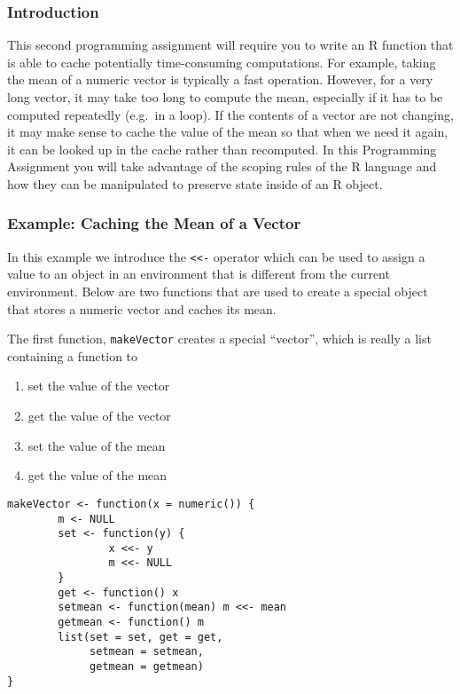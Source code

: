 \documentclass[]{article}
\title{}
\author{}
\date{}
\begin{document}
\maketitle


\subsubsection{Introduction}\label{introduction}

This second programming assignment will require you to write an R
function that is able to cache potentially time-consuming computations.
For example, taking the mean of a numeric vector is typically a fast
operation. However, for a very long vector, it may take too long to
compute the mean, especially if it has to be computed repeatedly
(e.g.~in a loop). If the contents of a vector are not changing, it may
make sense to cache the value of the mean so that when we need it again,
it can be looked up in the cache rather than recomputed. In this
Programming Assignment you will take advantage of the scoping rules of
the R language and how they can be manipulated to preserve state inside
of an R object.

\subsubsection{Example: Caching the Mean of a
Vector}\label{example-caching-the-mean-of-a-vector}

In this example we introduce the \texttt{\textless{}\textless{}-}
operator which can be used to assign a value to an object in an
environment that is different from the current environment. Below are
two functions that are used to create a special object that stores a
numeric vector and caches its mean.

The first function, \texttt{makeVector} creates a special ``vector'',
which is really a list containing a function to

\begin{enumerate}
\def\labelenumi{\arabic{enumi}.}
\itemsep1pt\parskip0pt
\item
  set the value of the vector
\item
  get the value of the vector
\item
  set the value of the mean
\item
  get the value of the mean
\end{enumerate}

\begin{verbatim}
makeVector <- function(x = numeric()) {
        m <- NULL
        set <- function(y) {
                x <<- y
                m <<- NULL
        }
        get <- function() x
        setmean <- function(mean) m <<- mean
        getmean <- function() m
        list(set = set, get = get,
             setmean = setmean,
             getmean = getmean)
}
\end{verbatim}
\end{document}
